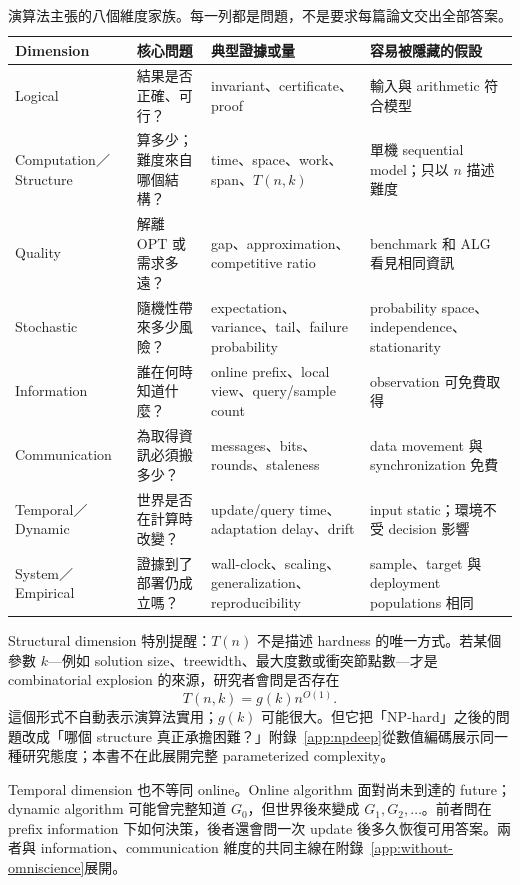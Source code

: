 \documentclass[11pt,a4paper,oneside,openany]{book}
\begin{document}
\begin{table}[htbp]
\centering
\caption{演算法主張的八個維度家族。每一列都是問題，不是要求每篇論文交出全部答案。}
\begin{tabularx}{\textwidth}{@{}p{}p{}YY@{}}
\toprule
Dimension & 核心問題 & 典型證據或量 & 容易被隱藏的假設 \\
\midrule
Logical & 結果是否正確、可行？ & invariant、certificate、proof & 輸入與 arithmetic 符合模型 \\
Computation／Structure & 算多少；難度來自哪個結構？ & time、space、work、span、$T(n,k)$ & 單機 sequential model；只以 $n$ 描述難度 \\
Quality & 解離 OPT 或需求多遠？ & gap、approximation、competitive ratio & benchmark 和 ALG 看見相同資訊 \\
Stochastic & 隨機性帶來多少風險？ & expectation、variance、tail、failure probability & probability space、independence、stationarity \\
Information & 誰在何時知道什麼？ & online prefix、local view、query/sample count & observation 可免費取得 \\
Communication & 為取得資訊必須搬多少？ & messages、bits、rounds、staleness & data movement 與 synchronization 免費 \\
Temporal／Dynamic & 世界是否在計算時改變？ & update/query time、adaptation delay、drift & input static；環境不受 decision 影響 \\
System／Empirical & 證據到了部署仍成立嗎？ & wall-clock、scaling、generalization、reproducibility & sample、target 與 deployment populations 相同 \\
\bottomrule
\end{tabularx}
\label{tab:algorithmic-dimensions}
\end{table}

Structural dimension 特別提醒：$T(n)$ 不是描述 hardness 的唯一方式。若某個參數 $k$---例如 solution size、treewidth、最大度數或衝突節點數---才是 combinatorial explosion 的來源，研究者會問是否存在
\[
 T(n,k)=g(k)n^{O(1)}.
\]
這個形式不自動表示演算法實用；$g(k)$ 可能很大。但它把「NP-hard」之後的問題改成「哪個 structure 真正承擔困難？」附錄~\ref{app:npdeep}從數值編碼展示同一種研究態度；本書不在此展開完整 parameterized complexity。

Temporal dimension 也不等同 online。Online algorithm 面對尚未到達的 future；dynamic algorithm 可能曾完整知道 $G_0$，但世界後來變成 $G_1,G_2,\ldots$。前者問在 prefix information 下如何決策，後者還會問一次 update 後多久恢復可用答案。兩者與 information、communication 維度的共同主線在附錄~\ref{app:without-omniscience}展開。
\end{document}
